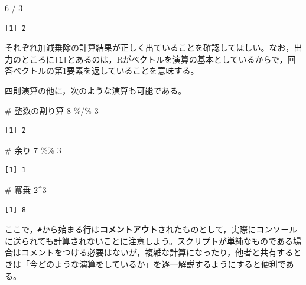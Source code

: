 \documentclass[
  a4paper,
]{ltjsbook}
\newenvironment{Shaded}{\begin{snugshade}}{\end{snugshade}}
\newcommand{\CommentTok}[1]{\textcolor[rgb]{0.37,0.37,0.37}{#1}}
\newcommand{\DecValTok}[1]{\textcolor[rgb]{0.68,0.00,0.00}{#1}}
\newcommand{\SpecialCharTok}[1]{\textcolor[rgb]{0.37,0.37,0.37}{#1}}
\begin{document}
\begin{Shaded}
\begin{Highlighting}[]
\DecValTok{6} \SpecialCharTok{/} \DecValTok{3}
\end{Highlighting}
\end{Shaded}

\begin{verbatim}
[1] 2
\end{verbatim}

それぞれ加減乗除の計算結果が正しく出ていることを確認してほしい。なお，出力のところに\texttt{{[}1{]}}とあるのは，Rがベクトルを演算の基本としているからで，回答ベクトルの第1要素を返していることを意味する。

四則演算の他に，次のような演算も可能である。

\begin{Shaded}
\begin{Highlighting}[]
\CommentTok{\# 整数の割り算}
\DecValTok{8} \SpecialCharTok{\%/\%} \DecValTok{3}
\end{Highlighting}
\end{Shaded}

\begin{verbatim}
[1] 2
\end{verbatim}

\begin{Shaded}
\begin{Highlighting}[]
\CommentTok{\# 余り}
\DecValTok{7} \SpecialCharTok{\%\%} \DecValTok{3}
\end{Highlighting}
\end{Shaded}

\begin{verbatim}
[1] 1
\end{verbatim}

\begin{Shaded}
\begin{Highlighting}[]
\CommentTok{\# 冪乗}
\DecValTok{2}\SpecialCharTok{\^{}}\DecValTok{3}
\end{Highlighting}
\end{Shaded}

\begin{verbatim}
[1] 8
\end{verbatim}

ここで，\texttt{\#}から始まる行は\textbf{コメントアウト}されたものとして，実際にコンソールに送られても計算されないことに注意しよう。スクリプトが単純なものである場合はコメントをつける必要はないが，複雑な計算になったり，他者と共有するときは「今どのような演算をしているか」を逐一解説するようにすると便利である。
\end{document}
